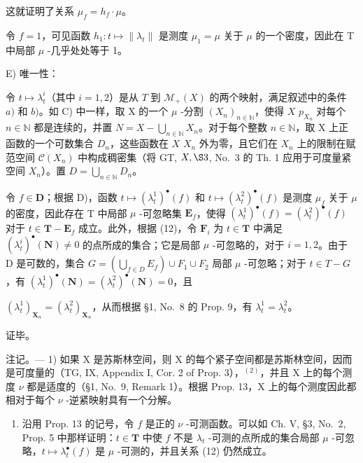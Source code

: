 这就证明了关系 \(\mu_f = h_f \cdot \mu\)。

令 \(f = 1\)，可见函数 \(h_1: t \mapsto \| \lambda_t \|\) 是测度 \(\mu_1 = \mu\) 关于 \(\mu\) 的一个密度，因此在 T 中局部 \(\mu\) -几乎处处等于 1。

E) 唯一性：

令 \(t \mapsto \lambda_t^i\)（其中 \(i = 1,2\)）是从 \(T\) 到 \(\mathcal{M}_+(X)\) 的两个映射，满足叙述中的条件 \(a)\) 和 \(b)\)。如 C) 中一样，取 X 的一个 \(\mu\) -分割 \((X_n)_{n \in \mathbb{N}}\)，使得 \(X\) \(p_{X_n}\) 对每个 \(n \in \mathbb{N}\) 都是连续的，并置 \(N = X - \bigcup_{n \in \mathbb{N}} X_n\)。对于每个整数 \(n \in \mathbb{N}\)，取 X 上正函数的一个可数集合 \(D_n\)，这些函数在 \(X\) \(X_n\) 外为零，且它们在 \(X_n\) 上的限制在赋范空间 \(\mathcal{C}(X_n)\) 中构成稠密集（将 GT, \(X, \S 3\), No.~3 的 Th. 1 应用于可度量紧空间 \(X_n\)）。置 \(D = \bigcup_{n \in \mathbb{N}} D_n\)。

令 \(f \in \mathbf{D}\)；根据 D)，函数 \(t \mapsto (\lambda_t^1)^{\bullet}(f)\) 和 \(t \mapsto (\lambda_t^2)^{\bullet}(f)\) 是测度 \(\mu_f\) 关于 \(\mu\) 的密度，因此存在 T 中局部 \(\mu\) -可忽略集 \(\mathbf{E}_f\)，使得 \((\lambda_t^1)^{\bullet}(f) = (\lambda_t^2)^{\bullet}(f)\) 对于 \(t \in \mathbf{T} - \mathbf{E}_f\) 成立。此外，根据 (12)，令 \(\mathbf{F}_i\) 为 \(t \in \mathbf{T}\) 中满足 \((\lambda_t^i)^{\bullet}(\mathbf{N}) \neq 0\) 的点所成的集合；它是局部 \(\mu\) -可忽略的，对于 \(i = 1, 2\)。由于 D 是可数的，集合 \(G = \left( \bigcup_{f \in D} E_f \right) \cup F_1 \cup F_2\) 局部 \(\mu\) -可忽略；对于 \(t \in T - G\)，有 \((\lambda_t^1)^{\bullet}(\mathbf{N}) = (\lambda_t^2)^{\bullet}(\mathbf{N}) = 0\)，且

\((\lambda_t^1)_{\mathbf{X}_n} = (\lambda_t^2)_{\mathbf{X}_n}\)，从而根据 §1, No.~8 的 Prop. 9，有 \(\lambda_t^1 = \lambda_t^2\)。

证毕。

注记。--- 1) 如果 X 是苏斯林空间，则 X 的每个紧子空间都是苏斯林空间，因而是可度量的（TG, IX, Appendix I, Cor. 2 of Prop. 3），\(^{(2)}\)，并且 X 上的每个测度 \(\nu\) 都是适度的（§1, No.~9, Remark 1）。根据 Prop. 13，X 上的每个测度因此都相对于每个 \(\nu\) -逆紧映射具有一个分解。

\begin{enumerate}
\def\labelenumi{\arabic{enumi})}
\setcounter{enumi}{1}
\tightlist
\item
  沿用 Prop. 13 的记号，令 \(f\) 是正的 \(\nu\) -可测函数。可以如 Ch. V, §3, No.~2, Prop. 5 中那样证明：\(t \in \mathbf{T}\) 中使 \(f\) 不是 \(\lambda_t\) -可测的点所成的集合局部 \(\mu\) -可忽略，\(t \mapsto \lambda_t^\bullet(f)\) 是 \(\mu\) -可测的，并且关系 (12) 仍然成立。
\end{enumerate}

